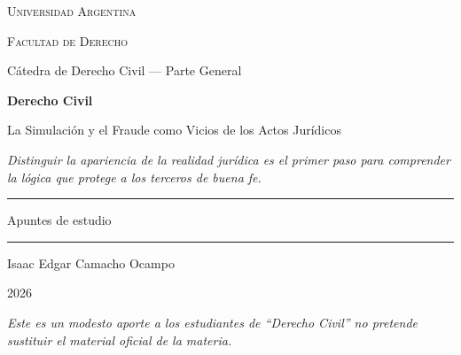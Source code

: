 \documentclass[12pt,oneside]{book}
\newcommand{\universidad}{Universidad Argentina}
\newcommand{\facultad}{Facultad de Derecho}
\newcommand{\carrera}{Cátedra de Derecho Civil --- Parte General}
\newcommand{\materia}{Derecho Civil}
\newcommand{\titulo}{La Simulación y el Fraude como Vicios de los Actos Jurídicos}
\newcommand{\autor}{Isaac Edgar Camacho Ocampo}
\newcommand{\anio}{2026}
\begin{document}
\begin{titlepage}

\thispagestyle{empty}

\begin{center}

\vspace*{1cm}

{\large \textsc{\universidad}}

\vspace{0.2cm}

{\large \textsc{\facultad}}

\vspace{0.2cm}

{\large \carrera}

\vspace{3cm}

{\Huge \textbf{\materia}}

\vspace{1cm}

{\LARGE \titulo}

\vspace{0.8cm}

\textit{Distinguir la apariencia de la realidad jurídica es el primer paso para comprender la lógica que protege a los terceros de buena fe.}

\vspace{1.2cm}

\rule{0.70\textwidth}{0.5pt}

\vspace{0.5cm}

{\large Apuntes de estudio}

\vspace{0.5cm}

\rule{0.70\textwidth}{0.5pt}

\vfill

{\large \autor}

\vspace{0.3cm}

{\large \anio}

\end{center}

\vfill

\begin{flushleft}
\textit{Este es un modesto aporte a los estudiantes de ``Derecho Civil'' no pretende sustituir el material oficial de la materia.}
\end{flushleft}

\end{titlepage}
\end{document}
